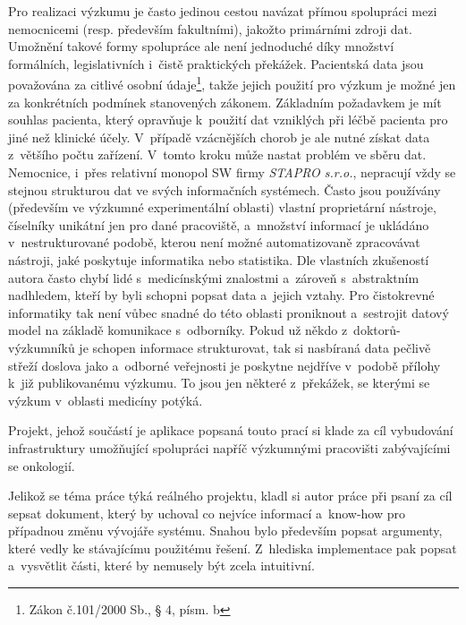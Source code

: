 \documentclass[11pt, draft, oneside]{fithesis2}
\begin{document}
Pro realizaci výzkumu je často jedinou cestou navázat přímou spolupráci mezi nemocnicemi (resp. především fakultními), jakožto primárními zdroji dat. Umožnění takové formy spolupráce ale není jednoduché díky množství formálních, legislativních i~čistě praktických překážek. Pacientská data jsou považována za citlivé osobní údaje\footnote{Zákon č.101/2000 Sb., § 4, písm. b }, takže jejich použití pro výzkum je možné jen za konkrétních podmínek stanovených zákonem. Základním požadavkem je mít souhlas pacienta, který opravňuje k~použití dat vzniklých při léčbě pacienta pro jiné než klinické účely. V~případě vzácnějších chorob je ale nutné získat data z~většího počtu zařízení. V~tomto kroku může nastat problém ve sběru dat. Nemocnice, i~přes relativní monopol SW firmy \textit{STAPRO s.r.o.}, nepracují vždy se stejnou strukturou dat ve svých informačních systémech. Často jsou používány (především ve výzkumné experimentální oblasti) vlastní proprietární nástroje, číselníky unikátní jen pro dané pracoviště, a~množství informací je ukládáno v~nestrukturované podobě, kterou není možné automatizovaně zpracovávat nástroji, jaké poskytuje informatika nebo statistika. Dle vlastních zkušeností autora často chybí lidé s~medicínskými znalostmi a~zároveň s~abstraktním nadhledem, kteří by byli schopni popsat data a~jejich vztahy. Pro čistokrevné informatiky tak není vůbec snadné do této oblasti proniknout a~sestrojit datový model na základě komunikace s~odborníky. Pokud už někdo z~doktorů-výzkumníků je schopen informace strukturovat, tak si nasbíraná data pečlivě střeží doslova jako  a~odborné veřejnosti je poskytne nejdříve v~podobě přílohy k~již publikovanému výzkumu. To jsou jen některé z~překážek, se kterými se výzkum v~oblasti medicíny potýká.

Projekt, jehož součástí je aplikace popsaná touto prací si klade za cíl vybudování infrastruktury umožňující spolupráci napříč výzkumnými pracovišti zabývajícími se onkologií. 

Jelikož se téma práce týká reálného projektu, kladl si autor práce při psaní za cíl sepsat dokument, který by uchoval co nejvíce informací a~know-how pro případnou změnu vývojáře systému. Snahou bylo především popsat argumenty, které vedly ke stávajícímu použitému řešení. Z~hlediska implementace pak popsat a~vysvětlit části, které by nemusely být zcela intuitivní.
\end{document}
